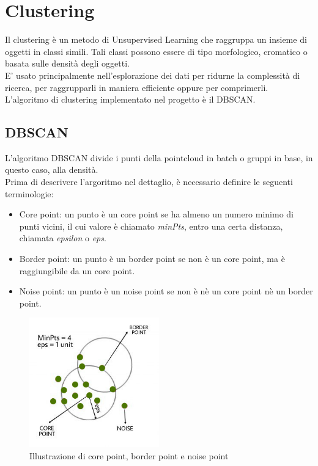\documentclass[italian]{report}
\begin{document}
\section{Clustering}
Il clustering è un metodo di Unsupervised Learning che raggruppa un insieme di oggetti in classi simili. Tali classi possono essere di tipo morfologico, cromatico o basata sulle densità degli oggetti.\\
E' usato principalmente nell'esplorazione dei dati per ridurne la complessità di ricerca, per raggrupparli in maniera efficiente oppure per comprimerli.\\
L'algoritmo di clustering implementato nel progetto è il DBSCAN.
\subsection{DBSCAN}
L'algoritmo DBSCAN divide i punti della pointcloud in batch o gruppi in base, in questo caso, alla densità.\\
Prima di descrivere l'argoritmo nel dettaglio, è necessario definire le seguenti terminologie:
\begin{itemize}
	\item Core point: un punto è un core point se ha almeno un numero minimo di punti vicini, il cui valore è chiamato \textit{minPts}, entro una certa distanza, chiamata \textit{epsilon} o \textit{eps}.
	\item Border point: un punto è un border point se non è un core point, ma è raggiungibile da un core point.
	\item Noise point: un punto è un noise point se non è nè un core point nè un border point.
\end{itemize}
\begin{figure}[H]
	\centering
	\includegraphics[width=0.5\textwidth]{clustering}
	\footnotesize
	\caption{Illustrazione di core point, border point e noise point}
\end{figure}\\
\end{document}
